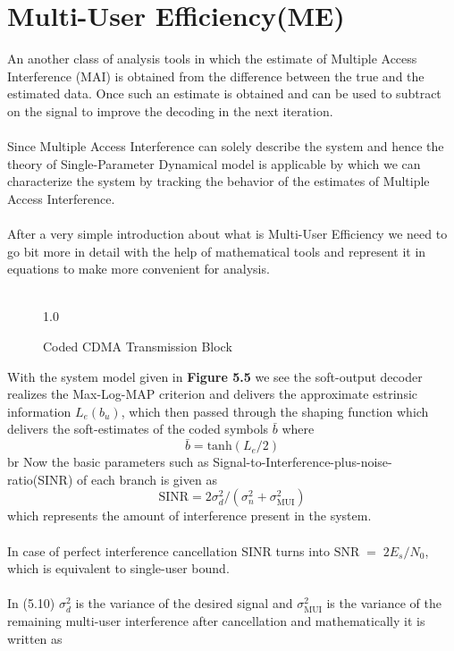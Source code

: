\section{Multi-User Efficiency(ME)}
An another class of analysis tools in which the estimate of Multiple Access Interference (MAI) is obtained from the difference between the true and the estimated data. Once such an estimate is obtained and can be used to subtract on the signal to improve the decoding in the next iteration.\\ \\
Since Multiple Access Interference can solely describe the system and hence the theory of Single-Parameter Dynamical model is applicable by which we can characterize the system by tracking the behavior of the estimates of Multiple Access Interference.\\ \\
After a very simple introduction about what is Multi-User Efficiency we need to go bit more in detail with the help of mathematical tools and represent it in equations to make more convenient for analysis. \\ \\
\begin{figure}[htb]
\centerline{  {1.0} }
\caption{Coded CDMA Transmission Block}
\end{figure}
With the system model given in \textbf{Figure 5.5} we see the soft-output decoder realizes the Max-Log-MAP criterion and delivers the approximate estrinsic information $L_e(b_u)$, which then passed through the shaping function which delivers the soft-estimates of the coded symbols $\bar{b}$ where
\begin{equation}
\bar{b}=\mathrm{tanh}(L_e/2)
\end{equation}br
Now the basic parameters such as Signal-to-Interference-plus-noise-ratio(SINR) of each branch is given as
\begin{equation}
\mathrm{SINR}=2\sigma_d^2/(\sigma_n^2+\sigma_{\mathrm{MUI}}^2)
\end{equation}
which represents the amount of interference present in the system.\\ \\
In case of perfect interference cancellation SINR turns into $\mathrm{SNR}\;=\;2E_s/N_0$, which is equivalent to single-user bound.\\ \\
In (5.10) $\sigma_d^2$ is the variance of the desired signal and $\sigma_{\mathrm{MUI}}^2$ is the variance of the remaining multi-user interference after cancellation and mathematically it is written as
